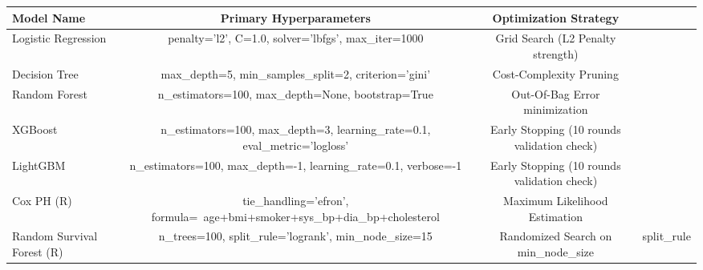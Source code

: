 \begin{tabular}{lcc}
\toprule
Model Name & Primary Hyperparameters & Optimization Strategy \\
\midrule
Logistic Regression & penalty='l2', C=1.0, solver='lbfgs', max_iter=1000 & Grid Search (L2 Penalty strength) \\
Decision Tree & max_depth=5, min_samples_split=2, criterion='gini' & Cost-Complexity Pruning \\
Random Forest & n_estimators=100, max_depth=None, bootstrap=True & Out-Of-Bag Error minimization \\
XGBoost & n_estimators=100, max_depth=3, learning_rate=0.1, eval_metric='logloss' & Early Stopping (10 rounds validation check) \\
LightGBM & n_estimators=100, max_depth=-1, learning_rate=0.1, verbose=-1 & Early Stopping (10 rounds validation check) \\
Cox PH (R) & tie_handling='efron', formula=~age+bmi+smoker+sys_bp+dia_bp+cholesterol & Maximum Likelihood Estimation \\
Random Survival Forest (R) & n_trees=100, split_rule='logrank', min_node_size=15 & Randomized Search on min_node_size & split_rule \\
\bottomrule
\end{tabular}
